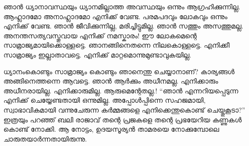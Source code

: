 ഞാന്‍ ധ്യാനാവസ്ഥയും ധ്യാനമില്ലാത്ത അവസ്ഥയും ഒന്നും ആഗ്രഹിക്കുന്നില്ല. ആഹ്ലാദമോ അനാഹ്ലാദമോ എനിക്ക് വേണ്ട. പരമപദവും ലോകവും ഒന്നും എനിക്ക് വേണ്ട. ഞാന്‍ ജീവിക്കുന്നില്ല, മരിച്ചിട്ടുമില്ല. ഞാന്‍ സത്തും അസത്തുമല്ല. അനന്തസത്യവസ്തുവായ എനിക്ക് നമസ്കാരം! ഈ ലോകമെന്റെ സാമ്രാജ്യമായിക്കൊള്ളട്ടെ. ഞാനങ്ങിനെതന്നെ നിലകൊള്ളട്ടെ. എനിക്കീ സാമ്രാജ്യം ഇല്ലാതാവട്ടെ. എനിക്ക് മാറ്റമൊന്നുമുണ്ടാവുകയില്ല.

ധ്യാനംകൊണ്ടും സാമ്രാജ്യം കൊണ്ടും ഞാനെന്തു ചെയ്യാനാണ്? കാര്യങ്ങള്‍ അങ്ങിനെത്തന്നെ ആവട്ടെ. ഞാന്‍ ആര്‍ക്കും അധീനമല്ല. എനിക്കാരും അധീനരായില്ല. എനിക്കാരുമില്ല. ആരുമെന്റേതല്ല.! “ഞാന്‍ എന്നറിയപ്പെടുന്ന എനിക്ക് ചെയ്യേണ്ടതായി ഒന്നുമില്ല. അപ്പോള്‍പ്പിന്നെ സഹജമായി, സ്വാഭാവികമായി വന്നുചേരുന്ന കര്‍മ്മങ്ങളെ എനിക്കെന്തുകൊണ്ട് ചെയ്തുകൂടാ?” ഇത്രയും പറഞ്ഞ് ബലി രാജാവ് തന്റെ പ്രജകളെ തന്റെ പ്രഭയേറിയ കണ്ണുകള്‍ കൊണ്ട് നോക്കി. ആ നോട്ടം, ഉദയസൂര്യന്‍ താമരയെ നോക്കുമ്പോലെ ചാരുതയാര്‍ന്നതായിരുന്നു.

